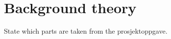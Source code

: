 \chapter{Background theory}\label{chapter:theory}

State which parts are taken from the prosjektoppgave.









